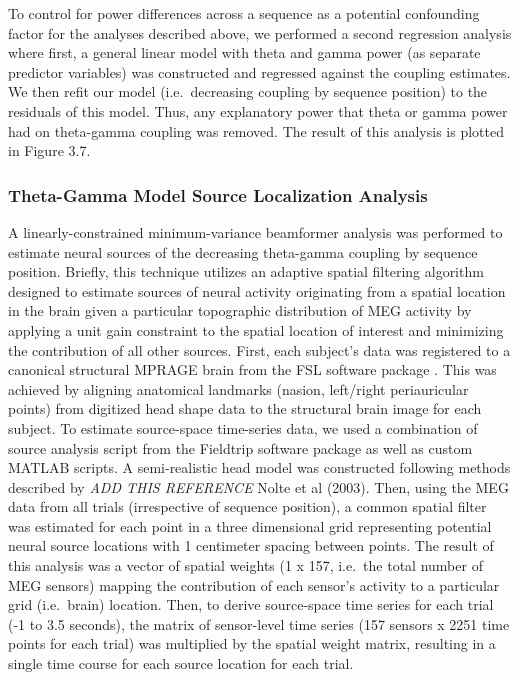 To control for power differences across a sequence as a potential
confounding factor for the analyses described above, we performed a
second regression analysis where first, a general linear model with
theta and gamma power (as separate predictor variables) was constructed
and regressed against the coupling estimates. We then refit our model
(i.e.~decreasing coupling by sequence position) to the residuals of this
model. Thus, any explanatory power that theta or gamma power had on
theta-gamma coupling was removed. The result of this analysis is plotted
in Figure 3.7.

\subsubsection{Theta-Gamma Model Source Localization
Analysis}\label{theta-gamma-model-source-localization-analysis}

A linearly-constrained minimum-variance beamformer analysis
\autocite{van_veen_localization_1997} was performed to estimate neural
sources of the decreasing theta-gamma coupling by sequence position.
Briefly, this technique utilizes an adaptive spatial filtering algorithm
designed to estimate sources of neural activity originating from a
spatial location in the brain given a particular topographic
distribution of MEG activity by applying a unit gain constraint to the
spatial location of interest and minimizing the contribution of all
other sources. First, each subject's data was registered to a canonical
structural MPRAGE brain from the FSL software package
\autocite{jenkinson_fsl_2012}. This was achieved by aligning anatomical
landmarks (nasion, left/right periauricular points) from digitized head
shape data to the structural brain image for each subject. To estimate
source-space time-series data, we used a combination of source analysis
script from the Fieldtrip software package as well as custom MATLAB
scripts. A semi-realistic head model was constructed following methods
described by \emph{ADD THIS REFERENCE} Nolte et al (2003). Then, using
the MEG data from all trials (irrespective of sequence position), a
common spatial filter was estimated for each point in a three
dimensional grid representing potential neural source locations with 1
centimeter spacing between points. The result of this analysis was a
vector of spatial weights (1 x 157, i.e.~the total number of MEG
sensors) mapping the contribution of each sensor's activity to a
particular grid (i.e.~brain) location. Then, to derive source-space time
series for each trial (-1 to 3.5 seconds), the matrix of sensor-level
time series (157 sensors x 2251 time points for each trial) was
multiplied by the spatial weight matrix, resulting in a single time
course for each source location for each trial.

